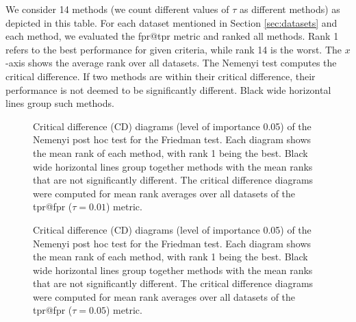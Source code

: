 \documentclass[]{interact}
\theoremstyle{plain}%
\theoremstyle{definition}
\theoremstyle{remark}
\newcommand{\NEW}[1]{{\color{blue} #1}}
\begin{document}
\NEW{We consider 14 methods (we count different values of $\tau$ as different methods) as depicted in this table. For each dataset mentioned in Section \ref{sec:datasets} and each method, we evaluated the fpr@tpr metric and ranked all methods. Rank 1 refers to the best performance for given criteria, while rank 14 is the worst. The $x$-axis shows the average rank over all datasets. The Nemenyi test computes the critical difference. If two methods are within their critical difference, their performance is not deemed to be significantly different. Black wide horizontal lines group such methods.}


\begin{figure}[!ht]
    \centering
    
    \vspace{-9mm}
    \caption{Critical difference (CD) diagrams (level of importance 0.05) of the Nemenyi post hoc test for the Friedman test. Each diagram shows the mean rank of each method, with rank 1 being the best. Black wide horizontal lines group together methods with the mean ranks that are not significantly different. The critical difference diagrams were computed for mean rank averages over all datasets of the tpr@fpr ($\tau=0.01$) metric.}
    \label{fig:cd1}
\end{figure}

\begin{figure}[!ht]
    \centering
    
    \vspace{-9mm}
    \caption{Critical difference (CD) diagrams (level of importance 0.05) of the Nemenyi post hoc test for the Friedman test. Each diagram shows the mean rank of each method, with rank 1 being the best. Black wide horizontal lines group together methods with the mean ranks that are not significantly different. The critical difference diagrams were computed for mean rank averages over all datasets of the tpr@fpr ($\tau=0.05$) metric.}
    \label{fig:cd2}
\end{figure}
\end{document}
